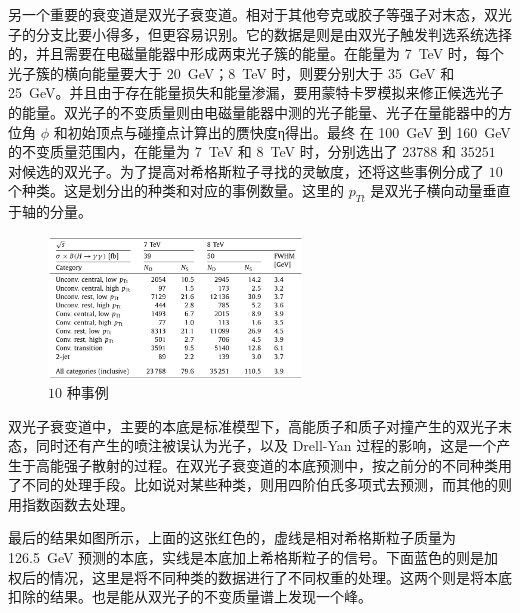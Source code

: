 另一个重要的衰变道是双光子衰变道。相对于其他夸克或胶子等强子对末态，双光子的分支比要小得多，但更容易识别。它的数据是则是由双光子触发判选系统选择的，并且需要在电磁量能器中形成两束光子簇的能量。在能量为 \qty{7}{TeV} 时，每个光子簇的横向能量要大于 \qty{20}{GeV}；\qty{8}{TeV} 时，则要分别大于 \qty{35}{GeV} 和 \qty{25}{GeV}。并且由于存在能量损失和能量渗漏，要用蒙特卡罗模拟来修正候选光子的能量。双光子的不变质量则由电磁量能器中测的光子能量、光子在量能器中的方位角 $\phi$ 和初始顶点与碰撞点计算出的赝快度η得出。最终 在 \qty{100}{GeV} 到 \qty{160}{GeV} 的不变质量范围内，在能量为 \qty{7}{TeV} 和 \qty{8}{TeV} 时，分别选出了 $23788$ 和 $35251$ 对候选的双光子。为了提高对希格斯粒子寻找的灵敏度，还将这些事例分成了 $10$ 个种类。这是划分出的种类和对应的事例数量。这里的 $p_{Tt}$ 是双光子横向动量垂直于轴的分量。

\begin{figure}[htbp]
    \centering
    \includegraphics[width=0.6\textwidth]{pic/10.png}
    \caption{$10$ 种事例}
    \label{fig:10}
\end{figure}

双光子衰变道中，主要的本底是标准模型下，高能质子和质子对撞产生的双光子末态，同时还有产生的喷注被误认为光子，以及 Drell-Yan 过程的影响，这是一个产生于高能强子散射的过程。在双光子衰变道的本底预测中，按之前分的不同种类用了不同的处理手段。比如说对某些种类，则用四阶伯氏多项式去预测，而其他的则用指数函数去处理。

最后的结果如图所示，上面的这张红色的，虚线是相对希格斯粒子质量为 \qty{126.5}{GeV} 预测的本底，实线是本底加上希格斯粒子的信号。下面蓝色的则是加权后的情况，这里是将不同种类的数据进行了不同权重的处理。这两个则是将本底扣除的结果。也是能从双光子的不变质量谱上发现一个峰。

